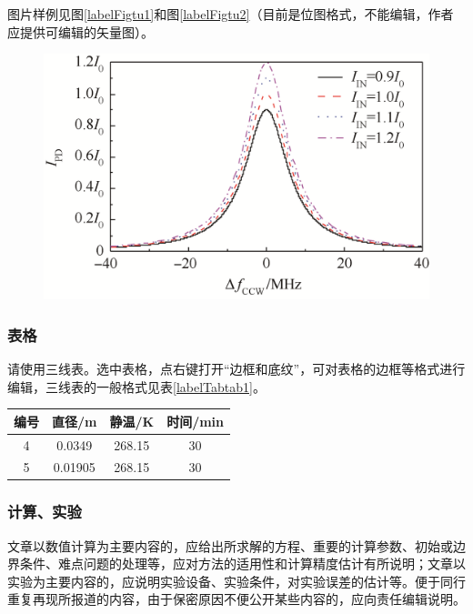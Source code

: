 \documentclass[10.5pt,twocolumn]{jbuaa}
\begin{document}
图片样例见图\ref{labelFigtu1}和图\ref{labelFigtu2}（目前是位图格式，不能编辑，作者应提供可编辑的矢量图）。

\begin{figure}[h!]
\centering
\includegraphics [scale=1,trim=0 0 0 0]{./image/tu2.png}
\end{figure}

\subsubsection{表格}
请使用三线表。选中表格，点右键打开``边框和底纹”，可对表格的边框等格式进行编辑，三线表的一般格式见表\ref{labelTabtab1}。
\begin{table}[h]
\centering
\captionnamefont{\xiaowuhao\bf }
\captiontitlefont{\xiaowuhao\bf }
\renewcommand\tabcolsep{1em}
\begin{tabular}{cccc}
\toprule
{编号} &  {直径}/\si{\metre} & {静温}/\si{\kelvin} & {时间}/min\\
\midrule 
4 & 0.0349 & 268.15 & 30\\
5 & 0.01905 & 268.15 & 30\\
\bottomrule
\end{tabular}
\end{table}

\subsubsection{计算、实验}
文章以数值计算为主要内容的，应给出所求解的方程、重要的计算参数、初始或边界条件、难点问题的处理等，应对方法的适用性和计算精度估计有所说明；文章以实验为主要内容的，应说明实验设备、实验条件，对实验误差的估计等。便于同行重复再现所报道的内容，由于保密原因不便公开某些内容的，应向责任编辑说明。
\end{document}
